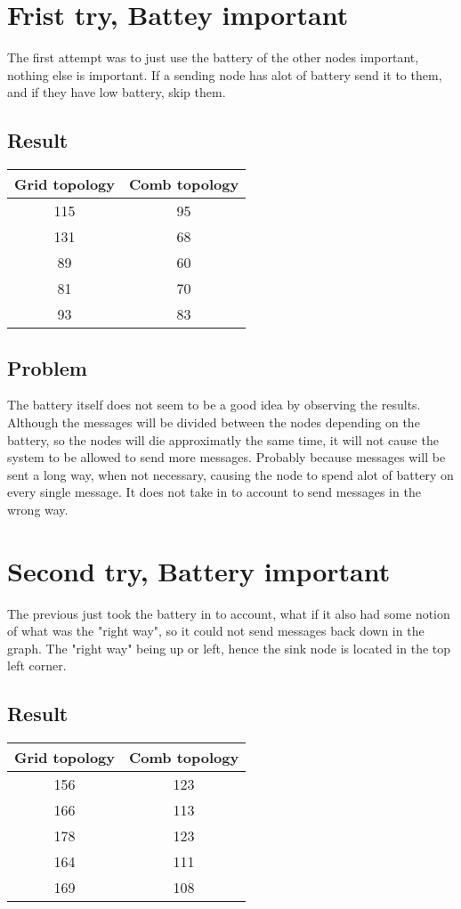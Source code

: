 \documentclass{article}
\begin{document}
\section{Frist try, Battey important}
  The first attempt was to just use the battery of the other nodes
  important, nothing else is important. If a sending node has alot of battery
  send it to them, and if they have low battery, skip them.
  \subsection{Result}
    \begin{tabular}{c|c}
      Grid topology & Comb topology\\
      \hline
      \hline
      115 & 95\\
      131 & 68\\
      89  & 60\\
      81  & 70\\
      93  & 83\\
    \end{tabular}
  \subsection{Problem}
    The battery itself does not seem to be a good idea by observing the results. 
    Although the messages will be divided between the nodes depending on the battery,
    so the nodes will die approximatly the same time, it will not cause the 
    system to be allowed to send more messages. Probably because messages will be sent 
    a long way, when not necessary, causing the node to spend alot of battery on 
    every single message.
    It does not take in to account to send messages in the wrong way.
  \section{Second try, Battery important}
    The previous just took the battery in to account, what if it also had
    some notion of what was the "right way", so it could not send messages
    back down in the graph. The "right way" being up or left, hence the sink
    node is located in the top left corner.
  \subsection{Result}
    \begin{tabular}{c|c}
      Grid topology & Comb topology\\
      \hline
      \hline
      156 & 123\\
      166 & 113\\
      178 & 123\\
      164 & 111\\
      169 & 108\\
    \end{tabular}
 
\end{document}
